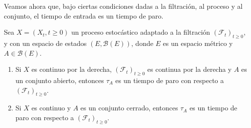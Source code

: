 Veamos ahora que, bajo ciertas condiciones dadas a la filtración, al proceso y al conjunto, el tiempo de entrada es un tiempo de paro.
\begin{proposition}
	Sea $X = (X_t, t \geq 0)$ un proceso estocástico adaptado a la filtración $(\mathcal{F}_t)_{t \geq 0}$, y con un espacio de estados $(E, \mathcal{B}(E))$, donde $E$ es un espacio métrico y $A \in\mathcal{B}(E)$.
	\begin{enumerate}
		\item Si $X$ es continuo por la derecha, $(\mathcal{F}_t)_{t \geq 0}$ es continua por la derecha y $A$ es un conjunto abierto, entonces $\tau_A$ es un tiempo de paro con respecto a $(\mathcal{F}_t)_{t \geq 0}$.
		\item Si $X$ es continuo y $A$ es un conjunto cerrado, entonces $\tau_A$ es un tiempo de paro con respecto a $(\mathcal{F}_t)_{t \geq 0}$.
	\end{enumerate}
\end{proposition}
